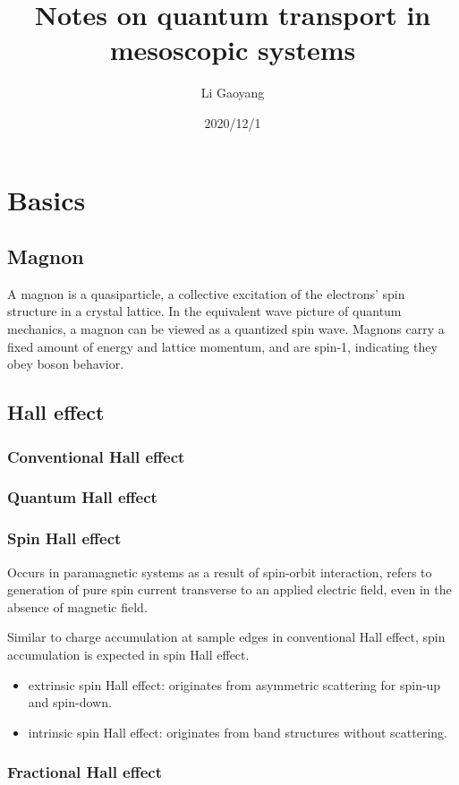 \documentclass[aps,prb,superscriptaddress]{revtex4-2}
\begin{document}
\title{Notes on quantum transport in mesoscopic systems}
\author{Li Gaoyang}
\date{2020/12/1}
\maketitle
\tableofcontents

\section{Basics}
\subsection{Magnon}
A magnon is a quasiparticle, a collective excitation of the electrons' spin structure in a crystal lattice. In the equivalent wave picture of quantum mechanics, a magnon can be viewed as a quantized spin wave. Magnons carry a fixed amount of energy and lattice momentum, and are spin-1, indicating they obey boson behavior.
\subsection{Hall effect}
\subsubsection{Conventional Hall effect}
\subsubsection{Quantum Hall effect}
\subsubsection{Spin Hall effect}
Occurs in paramagnetic systems as a result of spin-orbit interaction, refers to generation of pure spin current transverse to an applied electric field, even in the absence of magnetic field.

Similar to charge accumulation at sample edges in conventional Hall effect, spin accumulation is expected in spin Hall effect.
\begin{itemize}
\item extrinsic spin Hall effect: originates from asymmetric scattering for spin-up and spin-down.
\item intrinsic spin Hall effect: originates from band structures without scattering.\cite{ref1}
\end{itemize}
\subsubsection{Fractional Hall effect}
\end{document}

